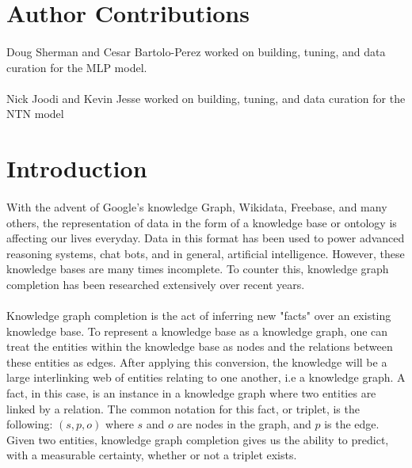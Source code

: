 \documentclass[11.5pt]{article}
\begin{document}
\pagebreak

\tableofcontents

\vfill
\section*{Author Contributions}
\paragraph{}
Doug Sherman and Cesar Bartolo-Perez worked on building, tuning, and data curation for the MLP model. 
\paragraph{}
Nick Joodi and Kevin Jesse worked on building, tuning, and data curation for the NTN model

\pagebreak

\section{Introduction}
\paragraph{} With the advent of Google's knowledge Graph, Wikidata, Freebase, and many others, the representation of data in the form of a knowledge base or ontology is affecting our lives everyday. Data in this format has been used to power advanced reasoning systems, chat bots, and in general, artificial intelligence. However, these knowledge bases are many times incomplete. To counter this, knowledge graph completion has been researched extensively over recent years. 

\paragraph{} Knowledge graph completion is the act of inferring new "facts" over an existing knowledge base. To represent a knowledge base as a knowledge graph, one can treat the entities within the knowledge base as nodes and the relations between these entities as edges. After applying this conversion, the knowledge will be a large interlinking web of entities relating to one another, i.e a knowledge graph. A fact, in this case, is an instance in a knowledge graph where two entities are linked by a relation. The common notation for this fact, or triplet, is the following:  $(s,p,o) $ where $s$ and $o$ are nodes in the graph, and $p$ is the edge. Given two entities, knowledge graph completion gives us the ability to predict, with a measurable certainty, whether or not a triplet exists.
\end{document}
